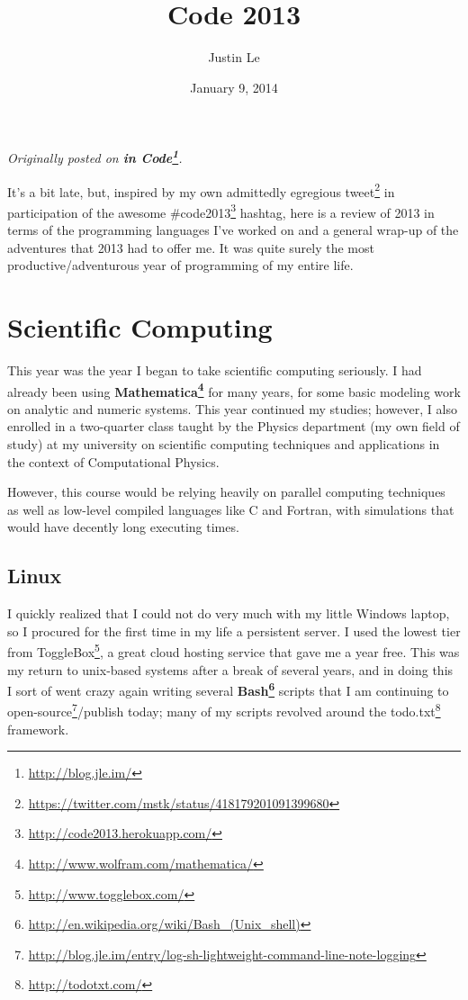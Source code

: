 \documentclass[]{article}
\title{Code 2013}
\author{Justin Le}
\date{January 9, 2014}
\renewcommand{\href}[2]{#2\footnote{\url{#1}}}
\begin{document}
\maketitle

\emph{Originally posted on \textbf{\href{http://blog.jle.im/}{in
Code}}.}

It's a bit late, but, inspired by my own admittedly egregious
\href{https://twitter.com/mstk/status/418179201091399680}{tweet} in
participation of the awesome
\href{http://code2013.herokuapp.com/}{\#code2013} hashtag, here is a
review of 2013 in terms of the programming languages I've worked on and
a general wrap-up of the adventures that 2013 had to offer me. It was
quite surely the most productive/adventurous year of programming of my
entire life.

\section{Scientific Computing}\label{scientific-computing}

This year was the year I began to take scientific computing seriously. I
had already been using
\textbf{\href{http://www.wolfram.com/mathematica/}{Mathematica}} for
many years, for some basic modeling work on analytic and numeric
systems. This year continued my studies; however, I also enrolled in a
two-quarter class taught by the Physics department (my own field of
study) at my university on scientific computing techniques and
applications in the context of Computational Physics.

However, this course would be relying heavily on parallel computing
techniques as well as low-level compiled languages like C and Fortran,
with simulations that would have decently long executing times.

\subsection{Linux}\label{linux}

I quickly realized that I could not do very much with my little Windows
laptop, so I procured for the first time in my life a persistent server.
I used the lowest tier from \href{http://www.togglebox.com/}{ToggleBox},
a great cloud hosting service that gave me a year free. This was my
return to unix-based systems after a break of several years, and in
doing this I sort of went crazy again writing several
\textbf{\href{http://en.wikipedia.org/wiki/Bash_(Unix_shell)}{Bash}}
scripts that I am continuing to
\href{http://blog.jle.im/entry/log-sh-lightweight-command-line-note-logging}{open-source}/publish
today; many of my scripts revolved around the
\href{http://todotxt.com/}{todo.txt} framework.
\end{document}
